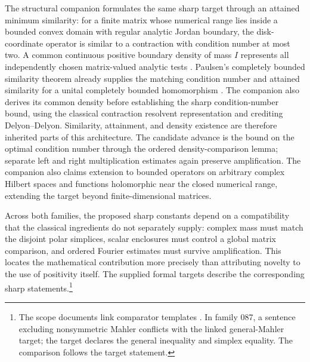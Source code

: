 The structural companion formulates the same sharp target through an
attained minimum similarity: for a finite matrix whose numerical range
lies inside a bounded convex domain with regular analytic Jordan
boundary, the disk-coordinate operator is similar to a contraction
with condition number at most two. A common continuous positive
boundary density of mass \(I\) represents all independently chosen
matrix-valued analytic tests \cite{GOOpenAIStructuralCrouzeix2026}.
Paulsen's completely bounded similarity theorem already supplies the
matching condition number and attained similarity for a unital
completely bounded homomorphism \cite{GOPaulsen1984}.
The companion also derives its common density before establishing
the sharp condition-number bound, using the classical contraction
resolvent representation and crediting Delyon--Delyon.
Similarity, attainment, and density existence are therefore inherited
parts of this architecture. The candidate advance is the bound on the
optimal condition number through the ordered density-comparison
lemma; separate left and right
multiplication estimates again preserve amplification. The companion
also claims extension to bounded operators on arbitrary complex
Hilbert spaces and functions holomorphic near the closed numerical
range, extending the target beyond finite-dimensional matrices.

Across both families, the proposed sharp constants depend on a
compatibility that the classical ingredients do not separately supply:
complex mass must match the disjoint polar simplices, scalar enclosures
must control a global matrix comparison, and ordered Fourier estimates
must survive amplification. This locates the mathematical contribution
more precisely than attributing novelty to the use of positivity itself.
The supplied formal targets describe the corresponding sharp
statements.\footnote{The scope documents link comparator templates
\cite{GOOpenAIScope0872026,GOOpenAIScope3252026}. In family 087, a
sentence excluding nonsymmetric Mahler conflicts with the linked
general-Mahler target; the target declares the general inequality and
simplex equality. The comparison follows the target statement.}
